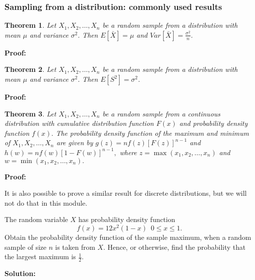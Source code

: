 \documentclass[12pt]{article}
\newtheorem{theorem}{Theorem}[section]
\newenvironment{example}[1][Example:]{\begin{trivlist}
\item[\hskip \labelsep {\bfseries #1}]}{\end{trivlist}}
\begin{document}
\subsubsection{Sampling from a distribution: commonly used results}
\begin{theorem}
Let $X_{1},X_{2},\ldots,X_{n}$ be a random sample from a distribution with mean $\mu$ and variance $\sigma^2$. Then $\displaystyle E[\bar{X}]=\mu$ and $\displaystyle Var[\bar{X}]=\frac{\sigma^2}{n}.$
\end{theorem}
\begin{mdframed}
{\bf Proof:}
\textcolor[rgb]{1.00,1.00,1.00}{\lipsum[1-3]}
\end{mdframed}

\begin{theorem}
Let $X_{1},X_{2},\ldots,X_{n}$ be a random sample from a distribution with mean $\mu$ and variance $\sigma^2$. Then $\displaystyle E[S^{2}]=\sigma^2$.
\end{theorem}
\begin{mdframed}
{\bf Proof:}
\textcolor[rgb]{1.00,1.00,1.00}{\lipsum[1-3]}
\end{mdframed}

\begin{theorem}
Let $X_{1},X_{2},\ldots,X_{n}$ be a random sample from a continuous distribution with cumulative distribution function $F(x)$ and probability density function $f(x).$ The probability density function of the maximum and minimum of $X_{1},X_{2},\ldots,X_{n}$ are given by $\displaystyle g(z)=nf(z)[F(z)]^{n-1}$ and $\displaystyle h(w)=nf(w)[1-F(w)]^{n-1},$ where $z=\max(x_{1},x_{2},\ldots,x_{n})$ and $w=\min(x_{1},x_{2},\ldots,x_{n}).$
\end{theorem}
\begin{mdframed}
{\bf Proof:}
\textcolor[rgb]{1.00,1.00,1.00}{\lipsum[1-8]}
\end{mdframed}
It is also possible to prove a similar result for discrete distributions, but we will not do that in this module.
\begin{example}
The random variable $X$ has probability density function
$$f(x)=12x^{2}(1-x)\,\,\, 0\leq x \leq 1.$$ Obtain the probability density function of the sample maximum, when a random sample of size $n$ is taken from $X$. Hence, or otherwise, find the probability that the largest maximum is $\frac{1}{2}.$
\end{example}
\begin{mdframed}
{\bf Solution:}
\textcolor[rgb]{1.00,1.00,1.00}{\lipsum[1-7]}
\end{mdframed}
\end{document}
